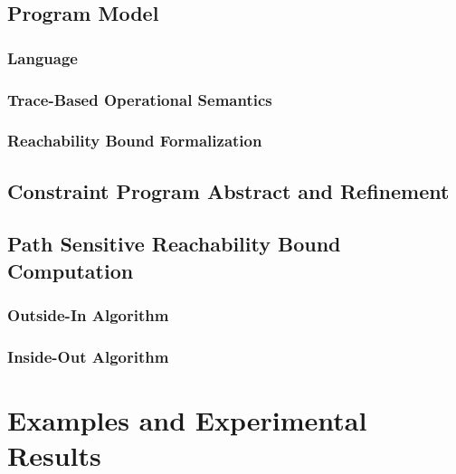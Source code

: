 \documentclass[12pt, letterpaper]{report}   %
\begin{document}
\section{{Program Model}}
\label{sec:language}
\subsection{Language}
\subsection{Trace-Based Operational Semantics}
% 
\subsection{{Reachability Bound Formalization}}
\label{sec:execution_rb}
% 
% 
\section{Constraint Program Abstract and Refinement}

\section{Path Sensitive Reachability Bound Computation}
\subsection{Outside-In Algorithm}
\label{sec:outsidein}
\subsection{Inside-Out Algorithm}
\label{sec:insideout}



\chapter{Examples and Experimental Results}
\label{sec:reachability-example}
\end{document}
